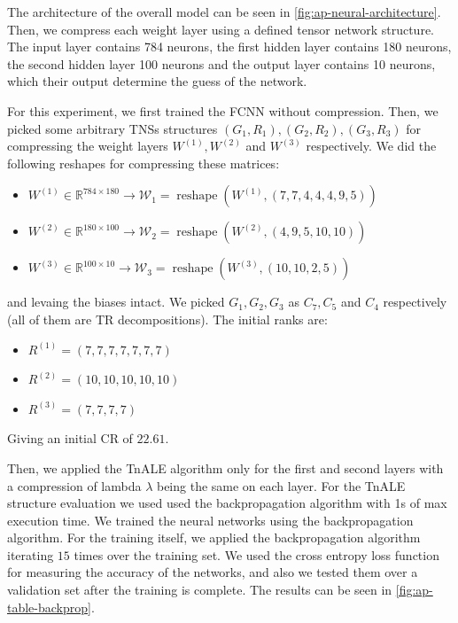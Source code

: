 \documentclass[11pt,a4paper,openright,oneside]{book}
\numberwithin{equation}{section}
\newcommand{\figref}[1]{\cref{#1}}
\DeclareMathOperator{\reshape}{reshape}
\begin{document}
{The architecture of the overall model can be seen in \ref{fig:ap-neural-architecture}. Then, we compress each weight
layer using a defined tensor network structure. The input layer contains 784 neurons, the first hidden layer
contains 180 neurons, the second hidden layer 100 neurons and the output layer contains 10 neurons, which their output
determine the guess of the network.

For this experiment, we first trained the FCNN without compression. Then, we picked some arbitrary
TNSs structures $(G_1, R_1), (G_2, R_2), (G_3, R_3)$ for compressing the weight layers $W^{(1)}, W^{(2)}$ and $W^{(3)}$
respectively. We did the following reshapes for compressing these matrices:
\begin{itemize}
    \item $W^{(1)} \in \mathbb{R}^{784 \times 180} \rightarrow \mathcal{W}_1 = \reshape(W^{(1)}, (7,7,4,4,4,9,5))$
    \item $W^{(2)} \in \mathbb{R}^{180 \times 100} \rightarrow \mathcal{W}_2 = \reshape(W^{(2)}, (4,9,5,10,10))$
    \item $W^{(3)} \in \mathbb{R}^{100 \times 10} \rightarrow \mathcal{W}_3 = \reshape(W^{(3)}, (10,10,2,5))$
\end{itemize}

and levaing the biases intact. We picked $G_1, G_2, G_3$ as $C_7, C_5$ and $C_4$ respectively (all of them are \gls{TR} decompositions). The initial ranks
are:

\begin{itemize}
    \item $R^{(1)} = (7,7,7,7,7,7,7)$
    \item $R^{(2)} = (10,10,10,10,10)$
    \item $R^{(3)} = (7,7,7,7)$
\end{itemize}
Giving an initial \gls{CR} of $22.61$.

Then, we applied the \gls{TnALE} algorithm only for the first and second layers with a compression of lambda $\lambda$ being the same on each layer. For the
\gls{TnALE} structure evaluation we used used the backpropagation algorithm with 1s of max execution time. 
We trained the neural networks using the backpropagation algorithm. For the training itself,
we applied the backpropagation algorithm iterating $15$ times
over the training set. We used the cross entropy loss function for measuring the accuracy of the networks, and also
we tested them over a validation set after the training is complete. The results can be seen in \figref{fig:ap-table-backprop}.

}
\end{document}
